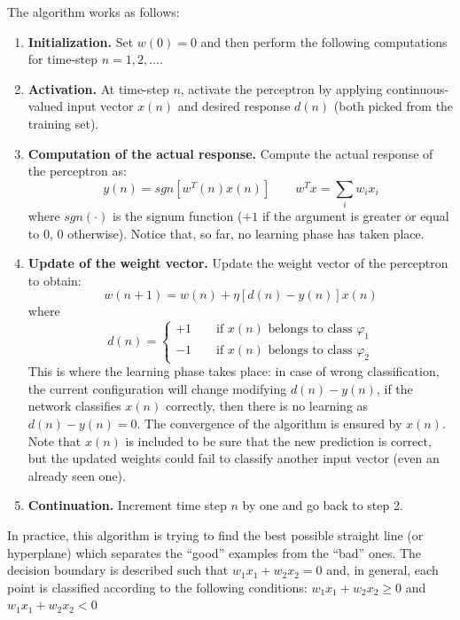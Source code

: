 The algorithm works as follows:

\begin{enumerate}

	\item \textbf{Initialization.} Set $w(0) = 0$ and then perform the following computations for time-step $n=1,2,\dots$.
 
	\item \textbf{Activation.} At time-step $n$, activate the perceptron by applying continuous-valued input vector $x(n)$ and desired response $d(n)$ (both picked from the training set).
 
	\item \textbf{Computation of the actual response.} Compute the actual response of the perceptron as:
	$$y(n) = sgn[w^T(n)x(n)] \qquad w^Tx = \sum_iw_ix_i$$
	where $sgn(\cdot)$ is the signum function ($+1$ if the argument is greater or equal to $0$, $0$ otherwise). Notice that, so far, no learning phase has taken place.
 
	\item \textbf{Update of the weight vector.} Update the weight vector of the perceptron to obtain:
	$$w(n+1) = w(n) + \eta[d(n) - y(n)]x(n)$$
	where
	$$d(n) = 
	\begin{cases}
	+1 \qquad \text{if } x(n) \text{ belongs to class } \varphi_1\\
	-1 \qquad \text{if } x(n) \text{ belongs to class } \varphi_2 
	\end{cases}$$
	This is where the learning phase takes place: in case of wrong classification, the current configuration will change modifying $d(n) - y(n)$, if the network classifies $x(n)$ correctly, then there is no learning as $d(n)-y(n) = 0$. The convergence of the algorithm is ensured by $x(n)$. Note that $x(n)$ is included to be sure that the new prediction is correct, but the updated weights could fail to classify another input vector (even an already seen one).
 
	\item \textbf{Continuation.} Increment time step $n$ by one and go back to step 2.
 
\end{enumerate}

In practice, this algorithm is trying to find the best possible straight line (or hyperplane) which separates the ``good'' examples from the ``bad'' ones. The decision boundary is described such that $w_1x_1 + w_2x_2 = 0$ and, in general, each point is classified according to the following conditions:  $w_1x_1 + w_2x_2 \geq 0$ and $w_1x_1 + w_2x_2 < 0$

